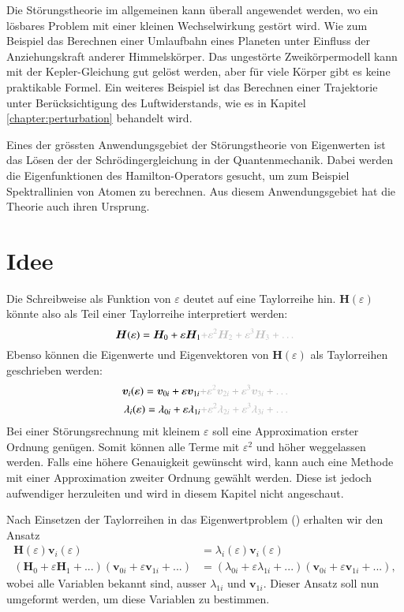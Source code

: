 Die Störungstheorie im allgemeinen kann überall angewendet werden, wo ein lösbares Problem mit einer kleinen Wechselwirkung gestört wird.
Wie zum Beispiel das Berechnen einer Umlaufbahn eines Planeten unter Einfluss der Anziehungskraft anderer Himmelskörper.
Das ungestörte Zweikörpermodell kann mit der Kepler-Gleichung gut gelöst werden, aber für viele Körper gibt es keine praktikable Formel.
Ein weiteres Beispiel ist das Berechnen einer Trajektorie unter Berücksichtigung des Luftwiderstands, wie es in Kapitel \ref{chapter:perturbation} behandelt wird.

Eines der grössten Anwendungsgebiet der Störungstheorie von Eigenwerten ist das Lösen der der Schrödingergleichung in der Quantenmechanik.
Dabei werden die Eigenfunktionen des Hamilton-Operators gesucht, um zum Beispiel Spektrallinien von Atomen zu berechnen.
Aus diesem Anwendungsgebiet hat die Theorie auch ihren Ursprung.

\section{Idee}

Die Schreibweise als Funktion von $\varepsilon$ deutet auf eine Taylorreihe hin.
$\bm H(\varepsilon)$ könnte also als Teil einer Taylorreihe interpretiert werden:
\begin{equation*}
    \bm H(\varepsilon) = \bm H_0 + \varepsilon \bm H_1 \GR{ + \varepsilon^2 \bm H_2  + \varepsilon^3 \bm H_3 + \dots}
\end{equation*}
Ebenso können die Eigenwerte und Eigenvektoren von $\bm H(\varepsilon)$ als Taylorreihen geschrieben werden:
\begin{align}
    \bm v_i(\varepsilon) = \bm v_{0i} + \varepsilon \bm v_{1i} \GR{ + \varepsilon^2 \bm v_{2i}  + \varepsilon^3 \bm v_{3i} + \dots} \label{ew:eq:eigvec} \\
    \lambda_i(\varepsilon) = \lambda_{0i} + \varepsilon \lambda_{1i} \GR{ + \varepsilon^2 \lambda_{2i}  + \varepsilon^3 \lambda_{3i} + \dots}  \label{ew:eq:eigval}
\end{align}
Bei einer Störungsrechnung mit kleinem $\varepsilon$ soll eine Approximation erster Ordnung genügen.
Somit können alle Terme mit $\varepsilon^2$ und höher weggelassen werden.
Falls eine höhere Genauigkeit gewünscht wird, kann auch eine Methode mit einer Approximation zweiter Ordnung gewählt werden.
Diese ist jedoch aufwendiger herzuleiten und wird in diesem Kapitel nicht angeschaut.

Nach Einsetzen der Taylorreihen in das Eigenwertproblem () erhalten wir den Ansatz
\begin{align}
    \bm H(\varepsilon) \bm v_i(\varepsilon)
    &=
    \lambda_i(\varepsilon) \bm v_i(\varepsilon) \\
    (\bm H_0 + \varepsilon \bm H_1 + ...)
    (\bm v_{0i} + \varepsilon \bm v_{1i} + ...)
    &=
    (\lambda_{0i} + \varepsilon \lambda_{1i} + ...)
    (\bm v_{0i} + \varepsilon \bm v_{1i} + ...),
\end{align}
wobei alle Variablen bekannt sind, ausser $\lambda_{1i}$ und $\bm v_{1i}$.
Dieser Ansatz soll nun umgeformt werden, um diese Variablen zu bestimmen.

